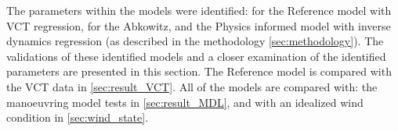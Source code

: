 The parameters within the models were identified: for the Reference model with VCT regression, for the Abkowitz, and the Physics informed model with inverse dynamics regression (as described in the methodology \autoref{sec:methodology}).
The validations of these identified models and a closer examination of the identified parameters are presented in this section. The Reference model is compared with the VCT data in \autoref{sec:result_VCT}. All of the models are compared with: the manoeuvring model tests in \autoref{sec:result_MDL}, and with an idealized wind condition in \autoref{sec:wind_state}.